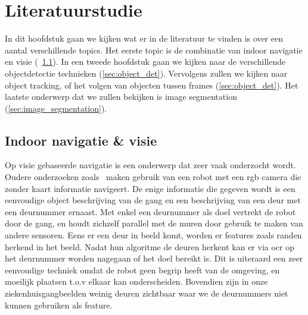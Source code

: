 
\chapter{Literatuurstudie}

In dit hoofdstuk gaan we kijken wat er in de literatuur te vinden is over een aantal verschillende topics.
Het eerste topic is de combinatie van indoor navigatie en visie (~\ref{sec:nav_visie}).
In een tweede hoofdstuk gaan we kijken naar de verschillende objectdetectie technieken (\ref{sec:object_det}).
Vervolgens zullen we kijken naar object tracking, of het volgen van objecten tussen frames (\ref{sec:object_det}).
Het laatste onderwerp dat we zullen bekijken is image segmentation (\ref{sec:image_segmentation}).

    \section{Indoor navigatie \& visie} \label{sec:nav_visie}
        Op visie gebaseerde navigatie is een onderwerp dat zeer vaak onderzocht wordt. Oudere onderzoeken zoals~\cite{Tomono2000} maken gebruik van een robot met een \gls{rgb} camera die zonder kaart informatie navigeert.
        De enige informatie die gegeven wordt is een eenvoudige object beschrijving van de gang en een beschrijving van een deur met een deurnummer ernaast.
        Met enkel een deurnummer als doel vertrekt de robot door de gang, en houdt zichzelf parallel met de muren door gebruik te maken van andere sensoren.
        Eens er een deur in beeld komt, worden er features zoals randen herkend in het beeld.
        Nadat hun algoritme de deuren herkent kan er via \gls{ocr} op het deurnummer worden nagegaan of het doel bereikt is.
        Dit is uiteraard een zeer eenvoudige techniek omdat de robot geen begrip heeft van de omgeving, en moeilijk plaatsen t.o.v elkaar kan onderscheiden.
        Bovendien zijn in onze ziekenhuisgangbeelden weinig deuren zichtbaar waar we de deurnummers niet kunnen gebruiken als feature.


